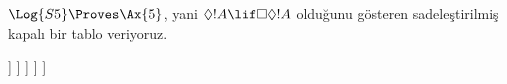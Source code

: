 \begin{ex}
  $\Log{S5} \Proves \Ax{5}$, yani $\Diamond!A \lif \Box\Diamond!A$
  olduğunu gösteren sadeleştirilmiş kapalı bir tablo veriyoruz.
  \begin{oltableau}
    [\pFmla{\False}{\Diamond\formula{A} \lif \Box\Diamond \formula{A}}{1},
      just = \TAss
      [\pFmla{\True}{\Diamond \formula{A}}{1}, just = {\TRule{\False}{\lif}[1]}
        [\pFmla{\False}{\Box\Diamond \formula{A}}{1},
          just = {\TRule{\False}{\lif}[1]}
          [\pFmla{\False}{\Diamond \formula{A}}{2},
            just = {\TRule{\False}{\Box}[3]}
            [\pFmla{\True}{\formula{A}}{3},
              just = {\TRule{\True}{\Diamond}[2]}
                [\pFmla{\False}{\formula{A}}{3},
                  just = {\TRule{\False}{\Diamond}[4]}, close]
            ]
          ]
        ]
      ]
    ]
  \end{oltableau}
\end{ex}

